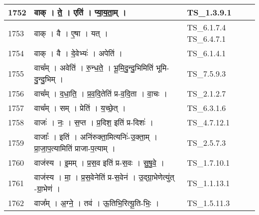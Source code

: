 \documentclass[17pt]{extarticle}
\begin{document}
\begin{longtable}{||p{0.4in}||p{4.9in}||p{0.9in}||}
    \hline
        
    1752 & वाक्   ।   ते॒   ।   एति॑   ।   प्या॒य॒ता॒म्   ।    & TS\_1.3.9.1       \\
    
    \hline
        
    1753 & वाक्   ।   वै   ।   ए॒षा   ।   यत्   ।    & TS\_6.1.7.4 TS\_6.4.7.1       \\
    
    \hline
        
    1754 & वाक्   ।   वै   ।   दे॒वेभ्यः॑   ।   अपेति॑   ।    & TS\_6.1.4.1       \\
    
    \hline
        
    1755 & वाच᳚म्   ।   अवेति॑   ।   रु॒न्ध॒ते॒   ।   भू॒मि॒दु॒न्दु॒भिमिति॑ भूमि{-}दु॒न्दु॒भिम्   ।    & TS\_7.5.9.3       \\
    
    \hline
        
    1756 & वाच᳚म्   ।   द॒धा॒ति॒   ।   प्र॒व॒दि॒तेति॑ प्र{-}व॒दि॒ता   ।   वा॒चः   ।    & TS\_2.1.2.7       \\
    
    \hline
        
    1757 & वाच᳚म्   ।   सम्   ।   प्रेति॑   ।   य॒च्छे॒त्   ।    & TS\_6.3.1.6       \\
    
    \hline
        
    1758 & वाजः॑   ।   नः॒   ।   स॒प्त   ।   प्र॒दिश॒ इति॑ प्र{-}दिशः॑   ।    & TS\_4.7.12.1       \\
    
    \hline
        
    1759 & वाजाः᳚   ।   इति॑   ।   अनि॑रुक्ता॒मित्यनिः॑{-}उ॒क्ता॒म्   ।   प्रा॒जा॒प॒त्यामिति॑ प्राजा{-}प॒त्याम्   ।    & TS\_2.5.7.3       \\
    
    \hline
        
    1760 & वाज॑स्य   ।   इ॒मम्   ।   प्र॒स॒व इति॑ प्र{-}स॒वः   ।   सु॒षु॒वे॒   ।    & TS\_1.7.10.1       \\
    
    \hline
        
    1761 & वाज॑स्य   ।   मा॒   ।   प्र॒स॒वेनेति॑ प्र{-}स॒वेन॑   ।   उ॒द्ग्रा॒भेणेत्यु॑त् {-}ग्रा॒भेण॑   ।    & TS\_1.1.13.1       \\
    
    \hline
        
    1762 & वाज᳚म्   ।   अ॒ग्ने॒   ।   तव॑   ।   ऊ॒तिभि॒रित्यू॒ति{-}भिः॒   ।    & TS\_1.5.11.3       \\
    

\end{longtable}
\end{document}
